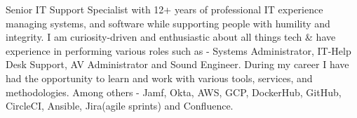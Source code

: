 

\begin{cvparagraph}

	Senior IT Support Specialist with 12+ years of professional IT experience managing systems, and software while supporting people with humility and integrity. I am curiosity-driven and enthusiastic about all things tech \& have experience in performing various roles such as - Systems Administrator, IT-Help Desk Support, AV Administrator and Sound Engineer. During my career I have had the opportunity to learn and work with various tools, services, and methodologies. Among others - Jamf, Okta, AWS, GCP, DockerHub, GitHub, CircleCI, Ansible, Jira(agile sprints) and Confluence.
\end{cvparagraph}
